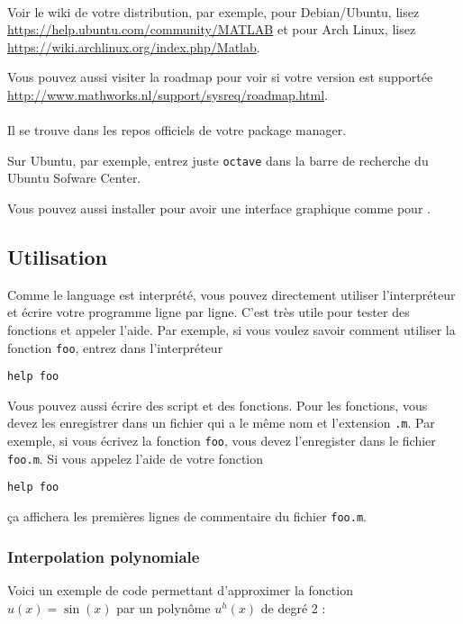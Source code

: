 \paragraph{\matlab{}}
Voir le wiki de votre distribution, par exemple,
pour Debian/Ubuntu, lisez
\url{https://help.ubuntu.com/community/MATLAB} et pour
Arch Linux, lisez
\url{https://wiki.archlinux.org/index.php/Matlab}.

Vous pouvez aussi visiter la roadmap pour voir si votre version est
supportée \url{http://www.mathworks.nl/support/sysreq/roadmap.html}.

\paragraph{\octave{}}
Il se trouve dans les repos officiels de votre package manager.

Sur Ubuntu, par exemple, entrez juste \verb|octave| dans la barre de
recherche du Ubuntu Sofware Center.

Vous pouvez aussi installer \qtoctave{} pour avoir une interface graphique
comme pour \matlab.

\subsection{Utilisation}
Comme le language est interprété, vous pouvez directement
utiliser l'interpréteur et écrire votre programme ligne par ligne.
C'est très utile pour tester des fonctions et appeler l'aide.
Par exemple, si vous voulez savoir comment utiliser la fonction
\lstinline|foo|, entrez dans l'interpréteur
\begin{lstlisting}
help foo
\end{lstlisting}

Vous pouvez aussi écrire des script et des fonctions.
Pour les fonctions, vous devez les enregistrer dans un fichier
qui a le même nom et l'extension \verb|.m|.
Par exemple, si vous écrivez la fonction \lstinline|foo|, vous devez
l'enregister dans le fichier \verb|foo.m|.
Si vous appelez l'aide de votre fonction
\begin{lstlisting}
help foo
\end{lstlisting}
ça affichera les premières lignes de commentaire du fichier \verb|foo.m|.

\subsubsection{Interpolation polynomiale}
Voici un exemple de code \matlab{} permettant d'approximer la fonction $u(x) = \sin(x)$
par un polynôme $u^h(x)$ de degré 2 :

